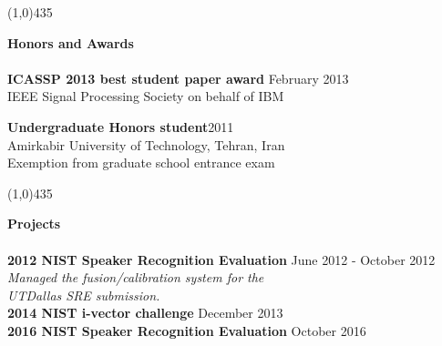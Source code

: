 	\vspace{0mm}
	\line(1,0){435}
	
	
	\vspace{0mm}
	\textbf{\sc Honors and Awards\\\\} 
	{\bf ICASSP 2013 best student paper award} \hfill {February 2013}\\
	IEEE Signal Processing Society on behalf of IBM
	
	\vspace{2mm}
	{\bf Undergraduate Honors student}\hfill {2011}\\
	Amirkabir University of Technology, Tehran, Iran \\
	Exemption from graduate school entrance exam
	
	\vspace{0mm}
	
	\vspace{0mm}
	\line(1,0){435}
	\vspace{0mm}
	
	\textbf{\sc Projects\\\\}
	{\bf 2012 NIST Speaker Recognition Evaluation} \hfill {June 2012 - October 2012}\\
	{\it Managed the fusion/calibration system for the \\UTDallas SRE submission.}\\
	
	\vspace{-1mm}
	{\bf 2014 NIST i-vector challenge} \hfill { December 2013}\\
	
	{\bf 2016 NIST Speaker Recognition Evaluation} \hfill { October 2016}\\
	
